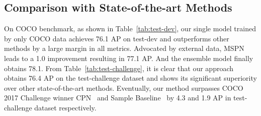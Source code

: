 \documentclass[10pt,twocolumn,letterpaper]{article}
\begin{document}
\subsection{Comparison with State-of-the-art Methods}
\label{part:sota}


On COCO benchmark, as shown in Table~\ref{tab:test-dev}, our single model trained by only COCO data achieves 76.1 AP on test-dev and outperforms other methods by a large margin in all metrics. Advocated by external data, MSPN leads to a 1.0 improvement resulting in 77.1 AP. And the ensemble model finally obtains 78.1. From Table~\ref{tab:test-challenge}, it is clear that our approach obtains 76.4 AP on the test-challenge dataset and shows its significant superiority over other state-of-the-art methods. Eventually, our method surpasses COCO 2017 Challenge winner CPN~\cite{chen2018cascaded} and Sample Baseline~\cite{xiao2018simple} by 4.3 and 1.9 AP in test-challenge dataset respectively.
\end{document}
